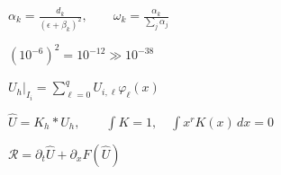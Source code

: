 \documentclass{article}
\begin{document}
\begin{preview}
\hbox{
\color[HTML]{242424}\fontsize{31}{37.199999999999996}\selectfont
$\displaystyle \alpha_k=\frac{d_k}{(\epsilon+\beta_k)^2},\qquad\omega_k=\frac{\alpha_k}{\sum_j\alpha_j}$
}
\end{preview}
\begin{preview}
\hbox{
\color[HTML]{242424}\fontsize{27}{32.4}\selectfont
$\displaystyle (10^{-6})^2=10^{-12}\gg 10^{-38}$
}
\end{preview}
\begin{preview}
\hbox{
\color[HTML]{242424}\fontsize{27}{32.4}\selectfont
$\displaystyle U_h|_{I_i}=\sum_{\ell=0}^{q}U_{i,\ell}\varphi_\ell(x)$
}
\end{preview}
\begin{preview}
\hbox{
\color[HTML]{242424}\fontsize{24}{28.799999999999997}\selectfont
$\displaystyle \widehat U=K_h*U_h,\qquad\int K=1,\quad\int x^rK(x)\,dx=0$
}
\end{preview}
\begin{preview}
\hbox{
\color[HTML]{242424}\fontsize{28}{33.6}\selectfont
$\displaystyle \mathscr R=\partial_t\widehat U+\partial_xF(\widehat U)$
}
\end{preview}
\end{document}
